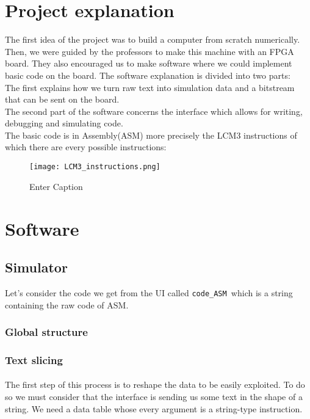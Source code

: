 \documentclass{article}
\newcommand{\code}[1]{\fontfamily{zi4}\texttt{#1}}
\newcommand{\codeASM}[0]{\code{code\_ASM }}
\begin{document}
\section{Project explanation}
The first idea of the project was to build a computer from scratch numerically. Then, we were guided by the professors to make this machine with an FPGA board. They also encouraged us to make software where we could implement basic code on the board. The software explanation is divided into two parts: \\
The first explains how we turn raw text into simulation data and a bitstream that can be sent on the board. \\
The second part of the software concerns the interface which allows for writing, debugging and simulating code. \\
The basic code is in Assembly(ASM) more precisely the LCM3 instructions of which there are every possible instructions: \\
\begin{figure}[h!]
    \centerline{\texttt{[image: LCM3\_instructions.png]}}
    \caption{Enter Caption}
    \label{fig:enter-label}
\end{figure}











\newpage
\section{Software}
\subsection{Simulator}

Let's consider the code we get from the UI called \codeASM which is a string containing the raw code of ASM. 
\subsubsection{Global structure}
\subsubsection{Text slicing}
\paragraph{}
The first step of this process is to reshape the data to be easily exploited. To do so we must consider that the interface is sending us some text in the shape of a string. We need a data table whose every argument is a string-type instruction.
\end{document}
